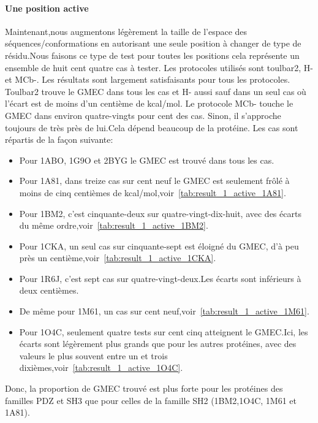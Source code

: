    \paragraph{Une position active}

Maintenant,nous augmentons légèrement la taille de l'espace des séquences/conformations en autorisant une seule position à changer de type de résidu.Nous faisons ce type de test pour toutes les positions cela représente un ensemble de huit cent quatre cas à tester. Les protocoles utilisés sont toulbar2, H- et MCb-. Les résultats sont largement satisfaisants pour tous les protocoles. Toulbar2 trouve le GMEC dans tous les cas et H- aussi sauf dans un seul cas où l'écart est de moins d'un centième de kcal/mol. Le protocole MCb- touche le GMEC dans environ quatre-vingts pour cent des cas. Sinon, il s'approche toujours de très près de lui.Cela dépend beaucoup de la protéine. Les cas sont répartis de la façon suivante:  

\begin{itemize}
\item Pour 1ABO, 1G9O et 2BYG le GMEC est trouvé dans tous les cas.
\item Pour 1A81, dans treize cas sur cent neuf le GMEC est seulement frôlé à moins de cinq centièmes de kcal/mol,voir~\ref{tab:result_1_active_1A81}.
\item Pour 1BM2,  c'est cinquante-deux sur quatre-vingt-dix-huit, avec des écarts du même ordre,voir~\ref{tab:result_1_active_1BM2}.
\item Pour 1CKA, un seul cas sur cinquante-sept est éloigné du GMEC, d'à peu près un centième,voir~\ref{tab:result_1_active_1CKA}.
\item Pour 1R6J, c'est sept cas sur quatre-vingt-deux.Les écarts sont inférieurs à deux centièmes.
\item De même pour 1M61, un cas sur cent neuf,voir~\ref{tab:result_1_active_1M61}.
\item Pour 1O4C, seulement quatre tests sur cent cinq atteignent le GMEC.Ici, les écarts sont légèrement plus grands que pour les autres protéines, avec des valeurs le plus souvent entre un et trois dixièmes,voir~\ref{tab:result_1_active_1O4C}. 
\end{itemize}

Donc, la proportion de GMEC trouvé est plus forte  pour les protéines des familles PDZ et SH3 que pour celles de la famille SH2 (1BM2,1O4C, 1M61 et 1A81).

